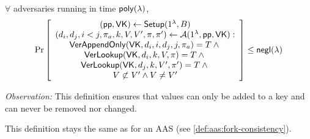 \begin{definition}
\label{def:aad:appendonly-security}
$\forall$ adversaries \Adv running in time $\mathsf{poly}(\lambda)$,
\begin{align*}
\Pr \left[ \begin{array}{c}
    (\mathsf{pp},\mathsf{VK}) \leftarrow \mathsf{Setup}(1^\lambda, B)\\
    (d_i,d_j,i<j,\pi_a, k,V,V',\pi,\pi') \leftarrow \mathcal{A}(1^\lambda, \mathsf{pp}, \mathsf{VK})
    : \\
    {\mathsf{VerAppendOnly}(\mathsf{VK}, d_i, i, d_j, j, \pi_a) = T} \wedge {}\\
    {\mathsf{VerLookup}(\mathsf{VK}, d_i, k, V , \pi )  = T} \wedge {}\\
    {\mathsf{VerLookup}(\mathsf{VK}, d_j, k, V', \pi') = T}\wedge {}\\
    {V\not\subset V' \wedge V\ne V'}
\end{array} \right] \le \mathsf{negl}(\lambda)
\end{align*}
\end{definition}

%

\noindent \textit{Observation:}
This definition ensures that values can only be added to a key and can never be removed nor changed.

\begin{definition}
This definition stays the same as for an AAS (see \cref{def:aas:fork-consistency}).
\end{definition}
